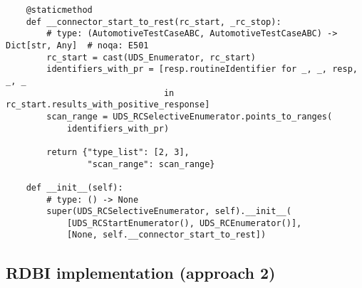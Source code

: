 \begin{verbatim}
    @staticmethod
    def __connector_start_to_rest(rc_start, _rc_stop):
        # type: (AutomotiveTestCaseABC, AutomotiveTestCaseABC) -> Dict[str, Any]  # noqa: E501
        rc_start = cast(UDS_Enumerator, rc_start)
        identifiers_with_pr = [resp.routineIdentifier for _, _, resp, _, _
                               in rc_start.results_with_positive_response]
        scan_range = UDS_RCSelectiveEnumerator.points_to_ranges(
            identifiers_with_pr)

        return {"type_list": [2, 3],
                "scan_range": scan_range}

    def __init__(self):
        # type: () -> None
        super(UDS_RCSelectiveEnumerator, self).__init__(
            [UDS_RCStartEnumerator(), UDS_RCEnumerator()],
            [None, self.__connector_start_to_rest])

\end{verbatim}

\subsection{RDBI implementation (approach 2)}

